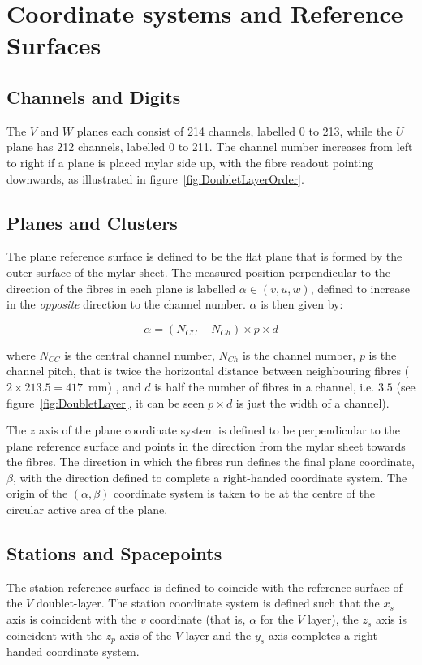 \section{Coordinate systems and Reference Surfaces}
\label{sec:Coordinates}

  \subsection{Channels and Digits}
  The $V$ and $W$ planes each consist of 214 channels, labelled 0 to 213, while the $U$ plane has 212 channels, labelled 0 to 211.  The channel number increases from left to right if a plane is placed mylar side up, with the fibre readout pointing downwards, as illustrated in figure~\ref{fig:DoubletLayerOrder}.

  \subsection{Planes and Clusters}
  \label{subsec:PlaneAndClusters}
  The plane reference surface is defined to be the flat plane that is formed by the outer surface of the mylar sheet. The measured position perpendicular to the direction of the fibres in each plane is labelled  $\alpha \in (v, u, w)$, defined to increase in the \textit{opposite} direction to the channel number. $\alpha$ is then given by:
  
  \begin{equation}
   \alpha = \left(N_{CC} - N_{Ch}\right) \times p \times d
  \end{equation}

  \noindent
  where $N_{CC}$ is the central channel number, $N_{Ch}$ is the channel number, $p$ is the channel pitch, that is twice the horizontal distance between neighbouring fibres ($2 \times 213.5 = 417$~mm) , and $d$ is half the number of fibres in a channel, i.e. $3.5$ (see figure~\ref{fig:DoubletLayer}, it can be seen $p \times d$ is just the width of a channel).  
  
  The $z$ axis of the plane coordinate system is defined to be perpendicular to the plane reference surface and points in the direction from the mylar sheet towards the fibres. The direction in which the fibres run defines the final plane coordinate, $\beta$, with the direction defined to complete a right-handed coordinate system. The origin of the $(\alpha, \beta)$ coordinate system is taken to be at the centre of the circular active area of the plane.

  \subsection{Stations and Spacepoints}
  The station reference surface is defined to coincide with the reference surface of the $V$ doublet-layer. The station coordinate system is defined such that the $x_s$ axis is coincident with the $v$ coordinate (that is, $\alpha$ for the $V$ layer), the $z_s$ axis is coincident with the $z_p$ axis of the $V$ layer and the $y_s$ axis completes a right-handed coordinate system.

